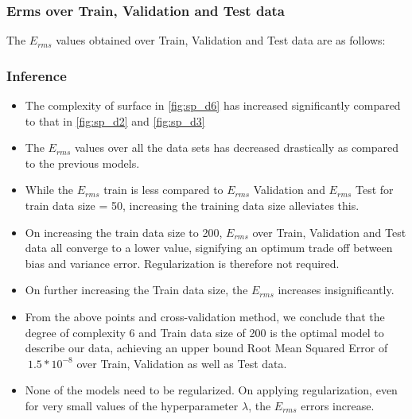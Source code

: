 \documentclass[12pt,a4paper]{article}
\begin{document}
\subsubsection{Erms over Train, Validation and Test data}
The $E_{rms}$ values obtained over Train, Validation and Test data are as follows: 
\break



\subsubsection{Inference}
\begin{itemize}
    \itemsep0em
    \item The complexity of surface in \autoref{fig:sp_d6} has increased significantly compared to that in \autoref{fig:sp_d2} and \autoref{fig:sp_d3}
    \item The $E_{rms}$ values over all the data sets has decreased drastically as compared to the previous models.
    \item While the $E_{rms}$ train is less compared to $E_{rms}$ Validation and $E_{rms}$ Test for train data size = 50, increasing the training data size alleviates this. 
    \item On increasing the train data size to 200, $E_{rms}$ over Train, Validation and Test data all converge to a lower value, signifying an optimum trade off between bias and variance error. Regularization is therefore not required.
    \item On further increasing the Train data size, the $E_{rms}$ increases insignificantly. 
    \item From the above points and cross-validation method, we conclude that the degree of complexity 6 and Train data size of 200 is the optimal model to describe our data, achieving an upper bound Root Mean Squared Error of $~1.5*10^{-8}$ over Train, Validation as well as Test data.
    \item None of the models need to be regularized. On applying regularization, even for very small values of the hyperparameter $\lambda$, the $E_{rms}$ errors increase. 
\end{itemize}
\end{document}

